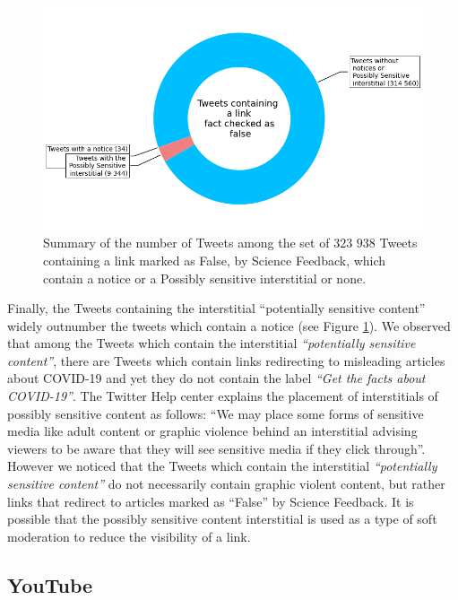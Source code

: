 \documentclass[Afour,sageh,times]{sagej}
\begin{document}
\begin{figure}[h]
	\centering
	\includegraphics[scale=0.4]{../figure/donut_twitter_2022_01_04.png}
	\caption{Summary of the number of Tweets among the set of $323$ $938$ Tweets containing a link marked as False, by Science Feedback, which contain a notice or a Possibly sensitive interstitial or none.}
\label{flags_tab}
\end{figure}

\smallskip

Finally, the Tweets containing the interstitial ``potentially sensitive content'' widely outnumber the tweets which contain a notice (see Figure \ref{flags_tab}). 
We observed that among the Tweets which contain the interstitial {\it ``potentially sensitive content''}, there are Tweets which contain links redirecting to misleading articles about COVID-19 and yet they do not contain the label { \it ``Get the facts about COVID-19''}. 
The Twitter Help center explains the placement of interstitials of possibly sensitive content as follows: ``We may place some forms of sensitive media like adult content or graphic violence behind an interstitial advising viewers to be aware that they will see sensitive media if they click through''.  
However we noticed that the Tweets which contain the interstitial {\it ``potentially sensitive content''} do not necessarily contain graphic violent content, but rather links that redirect to articles marked as ``False'' by Science Feedback. 
It is possible that the possibly sensitive content interstitial is used as a type of soft moderation to reduce the visibility of a link. 

\subsection{YouTube} \label{youtube_panels}
\end{document}
